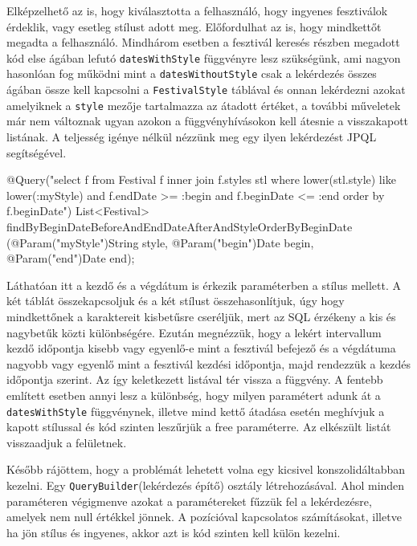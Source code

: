 Elképzelhető az is, hogy kiválasztotta a felhasználó, hogy ingyenes fesztiválok érdeklik, vagy esetleg stílust adott meg. Előfordulhat az is, hogy mindkettőt megadta a felhasználó. Mindhárom esetben a fesztivál keresés részben megadott kód else ágában lefutó \texttt{datesWithStyle} függvényre lesz szükségünk, ami nagyon hasonlóan fog működni mint a \texttt{datesWithoutStyle} csak a lekérdezés összes ágában össze kell kapcsolni a \texttt{FestivalStyle} táblával és onnan lekérdezni azokat amelyiknek a \texttt{style} mezője tartalmazza az átadott értéket, a további műveletek már nem változnak ugyan azokon a függvényhívásokon kell átesnie a visszakapott listának. A teljesség igénye nélkül nézzünk meg egy ilyen lekérdezést JPQL segítségével.

\begin{java}
@Query("select f from Festival f inner join f.styles stl where 
lower(stl.style) like lower(:myStyle) and f.endDate >= :begin
and f.beginDate <= :end order by f.beginDate")
List<Festival> 
findByBeginDateBeforeAndEndDateAfterAndStyleOrderByBeginDate
(@Param("myStyle")String style, @Param("begin")Date begin, 
@Param("end")Date end);
\end{java}

Láthatóan itt a kezdő és a végdátum is érkezik paraméterben a stílus mellett. A két táblát összekapcsoljuk és a két stílust összehasonlítjuk, úgy hogy mindkettőnek a karaktereit kisbetűsre cseréljük, mert az SQL érzékeny a kis és nagybetűk közti különbségére. Ezután megnézzük, hogy a lekért intervallum kezdő időpontja kisebb vagy egyenlő-e mint a fesztivál befejező és a végdátuma nagyobb vagy egyenlő mint a fesztivál kezdési időpontja, majd rendezzük a kezdés időpontja szerint. Az így keletkezett listával tér vissza a függvény. A fentebb említett esetben annyi lesz a különbség, hogy milyen paramétert adunk át a \texttt{datesWithStyle} függvénynek, illetve mind kettő átadása esetén meghívjuk a kapott stílussal és kód szinten leszűrjük a free paraméterre. Az elkészült listát visszaadjuk a felületnek.

Később rájöttem, hogy a problémát lehetett volna egy kicsivel konszolidáltabban kezelni. Egy \texttt{QueryBuilder}(lekérdezés építő) osztály létrehozásával. Ahol minden paraméteren végigmenve azokat a paramétereket fűzzük fel a lekérdezésre, amelyek nem null értékkel jönnek. A pozícióval kapcsolatos számításokat, illetve ha jön stílus és ingyenes, akkor azt is kód szinten kell külön kezelni. 

